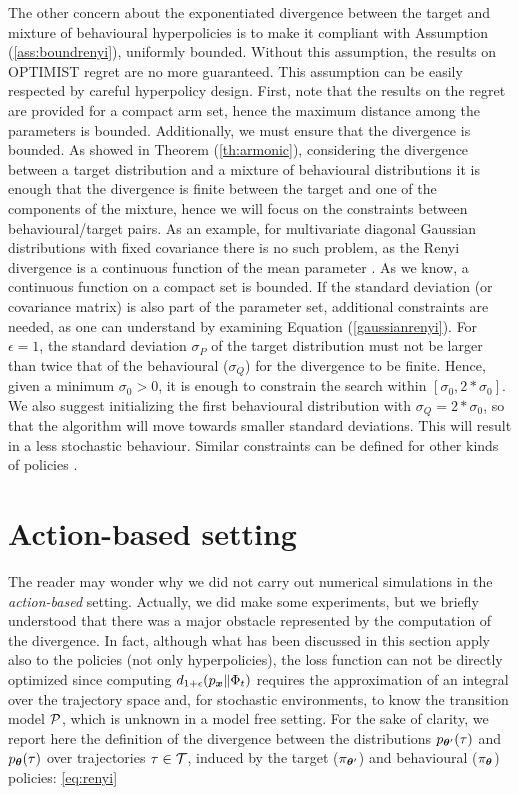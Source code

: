 The other concern about the exponentiated \Renyi divergence between the target and mixture of behavioural hyperpolicies is to make it compliant with Assumption (\ref{ass:boundrenyi}), \ie uniformly bounded. Without this assumption, the results on \gls{OPTIMIST} regret are no more guaranteed. This assumption can be easily respected by careful hyperpolicy design. First, note that the results on the regret are provided for a compact arm set, hence the maximum distance among the parameters is bounded. Additionally, we must ensure that the \Renyi divergence is bounded. As showed in Theorem (\ref{th:armonic}), considering the divergence between a target distribution and a mixture of behavioural distributions it is enough that the divergence is finite between the target and one of the components of the mixture, hence we will focus on the constraints between behavioural/target pairs. As an example, for multivariate diagonal Gaussian distributions with fixed covariance there is no such problem, as the Renyi divergence is a continuous function of the mean parameter \cite{gil2013renyi}. As we know, a continuous function on a compact set is bounded. If the standard deviation (or covariance matrix) is also part of the parameter set, additional constraints are needed, as one can understand by examining Equation (\ref{gaussianrenyi}). For $\epsilon=1$, the standard deviation $\sigma_P$ of the target distribution must not be larger than twice that of the behavioural ($\sigma_Q$) for the divergence to be finite. Hence, given a minimum $\sigma_{0} > 0$, it is enough to constrain the search within $[\sigma_0, 2*\sigma_0]$. We also suggest initializing the first behavioural distribution with $\sigma_Q=2*\sigma_0$, so that the algorithm will move towards smaller standard deviations. This will result in a less stochastic behaviour. Similar constraints can be defined for other kinds of policies \cite{gil2013renyi}. 

\section{Action-based setting}

The reader may wonder why we did not carry out numerical simulations in the \emph{action-based} setting. Actually, we did make some experiments, but we briefly understood that there was a major obstacle represented by the computation of the \Renyi divergence. In fact, although what has been discussed in this section apply also to the policies (not only hyperpolicies), the loss function can not be directly optimized since computing $d_{1+\epsilon}(p_{\boldsymbol{x}}\|\Phi_t)$ requires the approximation of an integral over the trajectory space and, for stochastic environments, to know the transition model $\mathcal{P}$, which is unknown in a model free setting. For the sake of clarity, we report here the definition of the \Renyi divergence between the distributions $p_{\boldsymbol{\theta}'}(\tau)$ and $p_{\boldsymbol{\theta}}(\tau)$ over trajectories $\tau\in\mathcal{T}$, induced by the target ($\pi_{\boldsymbol{\theta}'}$) and behavioural ($\pi_{\boldsymbol{\theta}}$) policies: \ref{eq:renyi}

